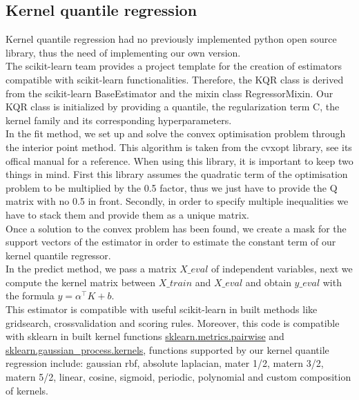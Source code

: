 \subsection{Kernel quantile regression}
Kernel quantile regression had no previously implemented python open source library, thus the need of implementing our own version.
\\
The scikit-learn team provides a project template for the creation of estimators compatible with scikit-learn functionalities. Therefore, the KQR class is derived from the scikit-learn BaseEstimator and the mixin class RegressorMixin.
Our KQR class is initialized by providing a quantile, the regularization term C, the kernel family and its corresponding hyperparameters.
\\
In the fit method, we set up and solve the convex optimisation problem through the interior point method. This algorithm is taken from the cvxopt library, see its offical manual \cite{vandenberghe2010cvxopt} for a reference.
When using this library, it is important to keep two things in mind. First this library assumes the quadratic term of the optimisation problem to be multiplied by the 0.5 factor, thus we just have to provide the Q matrix with no 0.5 in front.
Secondly, in order to specify multiple inequalities we have to stack them and provide them as a unique matrix.
\\
Once a solution to the convex problem has been found, we create a mask for the support vectors of the estimator in order to estimate the constant term of our kernel quantile regressor.
\\
In the predict method, we pass a matrix $X\_eval$ of independent variables, next we compute the kernel matrix between $X\_train$ and $X\_eval$ and obtain $y\_eval$ with the formula $y=\alpha^\intercal K+b$.
\\
This estimator is compatible with useful scikit-learn in built methods like gridsearch, crossvalidation and scoring rules. Moreover, this code is compatible with sklearn in built kernel functions \href{https://scikit-learn.org/stable/modules/classes.html#module-sklearn.metrics.pairwise}{sklearn.metrics.pairwise} and \href{https://scikit-learn.org/stable/modules/classes.html#module-sklearn.gaussian_process.kernels}{sklearn.gaussian\_process.kernels}, functions supported by our kernel quantile regression include: gaussian rbf, absolute laplacian, mater 1/2, matern 3/2, matern 5/2, linear, cosine, sigmoid, periodic, polynomial and custom composition of kernels.


